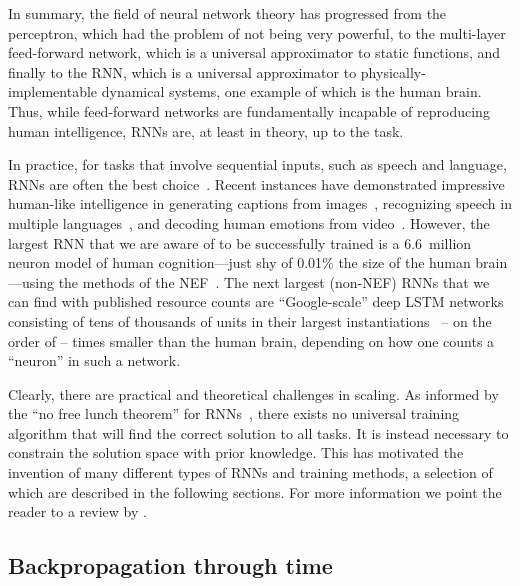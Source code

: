 In summary, the field of neural network theory has progressed from the perceptron, which had the problem of not being very powerful, to the multi-layer feed-forward network, which is a universal approximator to static functions, and finally to the RNN, which is a universal approximator to physically-implementable dynamical systems, one example of which is the human brain.
Thus, while feed-forward networks are fundamentally incapable of reproducing human intelligence, RNNs are, at least in theory, up to the task.

In practice, for tasks that involve sequential inputs, such as speech and language, RNNs are often the best choice~\citep{lecun2015deep}.
Recent instances have demonstrated impressive human-like intelligence in generating captions from images~\citep{vinyals2015show}, recognizing speech in multiple languages~\citep{amodei2016deep}, and decoding human emotions from video~\citep{ebrahimi2015recurrent}.
However, the largest RNN that we are aware of to be successfully trained is a 6.6~million neuron model of human cognition---just shy of 0.01\% the size of the human brain---using the methods of the NEF~\citep{choo2018}.
The next largest (non-NEF) RNNs that we can find with published resource counts are ``Google-scale'' deep LSTM networks consisting of tens of thousands of units in their largest instantiations~\citep{sak2014long, wu2016google} -- on the order of -- times smaller than the human brain, depending on how one counts a ``neuron'' in such a network.

Clearly, there are practical and theoretical challenges in scaling.
As informed by the ``no free lunch theorem'' for RNNs~\citep{wiklicky1994non}, there exists no universal training algorithm that will find the correct solution to all tasks.
It is instead necessary to constrain the solution space with prior knowledge.
This has motivated the invention of many different types of RNNs and training methods, a selection of which are described in the following sections.
For more information we point the reader to a review by \citet{salehinejad2017recent}.

\subsection{Backpropagation through time}
\label{sec:bptt}

